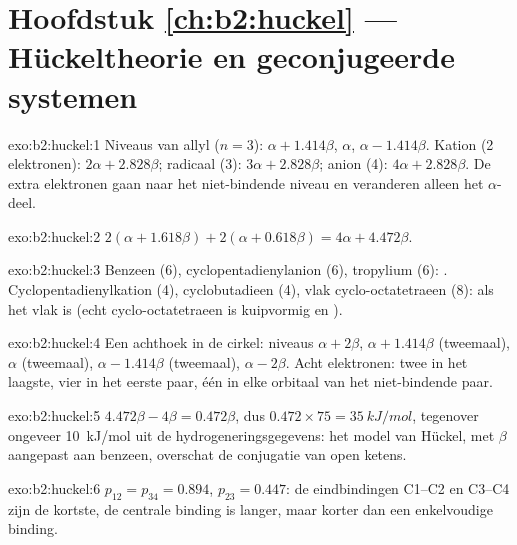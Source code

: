 \section*{Hoofdstuk \ref{ch:b2:huckel} --- Hückeltheorie en geconjugeerde systemen}

\begin{solution}{exo:b2:huckel:1}
Niveaus van allyl ($n = 3$): $\alpha + 1.414\beta$, $\alpha$, $\alpha - 1.414\beta$. Kation (2 elektronen):
$2\alpha + 2.828\beta$; radicaal (3): $3\alpha + 2.828\beta$; anion (4): $4\alpha + 2.828\beta$. De extra
elektronen gaan naar het niet-bindende niveau en veranderen alleen het $\alpha$-deel.
\end{solution}

\begin{solution}{exo:b2:huckel:2}
$2(\alpha + 1.618\beta) + 2(\alpha + 0.618\beta) = 4\alpha + 4.472\beta$.
\end{solution}

\begin{solution}{exo:b2:huckel:3}
Benzeen (6), cyclopentadienylanion (6), tropylium (6): . Cyclopentadienylkation
(4), cyclobutadieen (4), vlak cyclo-octatetraeen (8):  als het vlak is
(echt cyclo-octatetraeen is kuipvormig en ).
\end{solution}

\begin{solution}{exo:b2:huckel:4}
Een achthoek in de cirkel: niveaus $\alpha + 2\beta$, $\alpha + 1.414\beta$ (tweemaal), $\alpha$ (tweemaal),
$\alpha - 1.414\beta$ (tweemaal), $\alpha - 2\beta$. Acht elektronen: twee in het laagste, vier in het
eerste paar, één in elke orbitaal van het niet-bindende paar.
\end{solution}

\begin{solution}{exo:b2:huckel:5}
$4.472\beta - 4\beta = 0.472\beta$, dus $0.472 \times 75 = \qty{35}{kJ/mol}$, tegenover ongeveer
\qty{10}{kJ/mol} uit de hydrogeneringsgegevens: het model van Hückel, met $\beta$ aangepast aan benzeen,
overschat de conjugatie van open ketens.
\end{solution}

\begin{solution}{exo:b2:huckel:6}
$p_{12} = p_{34} = 0.894$, $p_{23} = 0.447$: de eindbindingen C1--C2 en C3--C4 zijn de
kortste, de centrale binding is langer, maar korter dan een enkelvoudige binding.
\end{solution}

